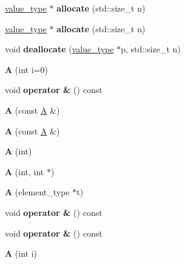 \begin{DoxyCompactItemize}
\mbox{\hyperlink{struct_t}{value\+\_\+type}} $\ast$ {\bfseries allocate} (std\+::size\+\_\+t n)
\item 
\mbox{\label{struct_a_a7993d0a2af1ba7cfb23a78e51a4da167}} 
\mbox{\hyperlink{struct_t}{value\+\_\+type}} $\ast$ {\bfseries allocate} (std\+::size\+\_\+t n)
\item 
\mbox{\label{struct_a_ab2a669ac693d07d963f363cd655979b3}} 
void {\bfseries deallocate} (\mbox{\hyperlink{struct_t}{value\+\_\+type}} $\ast$p, std\+::size\+\_\+t n)
\item 
\mbox{\label{struct_a_af517c3740aab491b7a0816078e0df3df}} 
{\bfseries A} (int i=0)
\item 
\mbox{\label{struct_a_a50e6be2f204c9fb52f84bb880922bba1}} 
void {\bfseries operator \&} () const
\item 
\mbox{\label{struct_a_aa0f98784263c664c8e73441c1ec951b8}} 
{\bfseries A} (const \mbox{\hyperlink{struct_a}{A}} \&)
\item 
\mbox{\label{struct_a_aa0f98784263c664c8e73441c1ec951b8}} 
{\bfseries A} (const \mbox{\hyperlink{struct_a}{A}} \&)
\item 
\mbox{\label{struct_a_a35544beaa5c5b4feb01ea610747092e3}} 
{\bfseries A} (int)
\item 
\mbox{\label{struct_a_aa5e082b7e503b3d77611022522261513}} 
{\bfseries A} (int, int $\ast$)
\item 
\mbox{\label{struct_a_a6adb620ee0f54d749d6b24c6f24cdb6d}} 
{\bfseries A} (element\+\_\+type $\ast$t)
\item 
\mbox{\label{struct_a_a50e6be2f204c9fb52f84bb880922bba1}} 
void {\bfseries operator \&} () const
\item 
\mbox{\label{struct_a_a50e6be2f204c9fb52f84bb880922bba1}} 
void {\bfseries operator \&} () const
\item 
\mbox{\label{struct_a_a22d71f135c658a041c1c6a27d9a7b1da}} 
{\bfseries A} (int i)

\end{DoxyCompactItemize}
